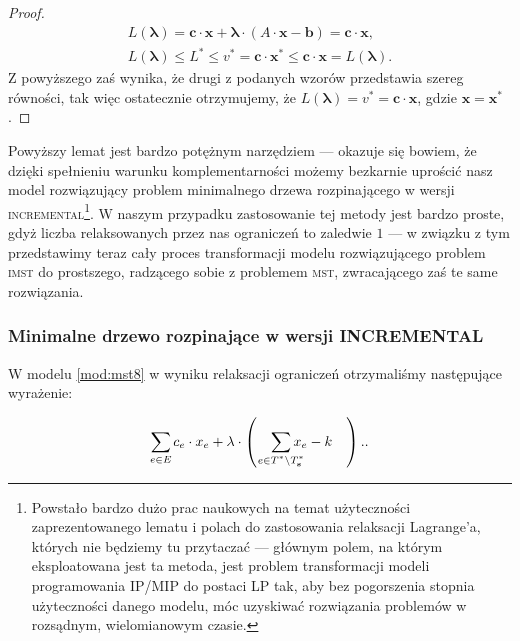 \begin{proof}
	\begin{gather}
		L \left( \boldsymbol{\lambda} \right) = \textbf{c} \cdot \textbf{x} + \boldsymbol{\lambda} \cdot \left( A \cdot \textbf{x} - \textbf{b} \right) = \textbf{c} \cdot \textbf{x}\text{,}\\
		L \left( \boldsymbol{\lambda} \right) \leqslant L^{\ast} \leqslant v^{\ast} = \textbf{c} \cdot \textbf{x}^{\ast} \leqslant \textbf{c} \cdot \textbf{x} = L \left( \boldsymbol{\lambda} \right)\text{.}
	\end{gather}
	Z powyższego zaś wynika, że drugi z podanych wzorów przedstawia szereg równości, tak więc ostatecznie otrzymujemy, że $L \left( \boldsymbol{\lambda} \right) = v^{\ast} = \textbf{c} \cdot \textbf{x}$, gdzie $\textbf{x} = \textbf{x}^{\ast}$.
\end{proof}

Powyższy lemat jest bardzo potężnym narzędziem --- okazuje się bowiem, że dzięki spełnieniu warunku komplementarności możemy bezkarnie uprościć nasz model rozwiązujący problem minimalnego drzewa rozpinającego w wersji \textsc{incremental}\footnote{Powstało bardzo dużo prac naukowych na temat użyteczności zaprezentowanego lematu i polach do zastosowania relaksacji Lagrange'a, których nie będziemy tu przytaczać --- głównym polem, na którym eksploatowana jest ta metoda, jest problem transformacji modeli programowania \textsc{IP}/\textsc{MIP} do postaci \textsc{LP} tak, aby bez pogorszenia stopnia użyteczności danego modelu, móc uzyskiwać rozwiązania problemów w rozsądnym, wielomianowym czasie.}. W naszym przypadku zastosowanie tej metody jest bardzo proste, gdyż liczba relaksowanych przez nas ograniczeń to zaledwie $1$ --- w związku z tym przedstawimy teraz cały proces transformacji modelu rozwiązującego problem \textsc{imst} do prostszego, radzącego sobie z problemem \textsc{mst}, zwracającego zaś te same rozwiązania.

\subsubsection{Minimalne drzewo rozpinające w wersji INCREMENTAL}

W modelu \ref{mod:mst8} w wyniku relaksacji ograniczeń otrzymaliśmy następujące wyrażenie:

\begin{equation}\label{eq:imstrelax}
	\sum_{\mathclap{e \in E}} c_{e} \cdot x_{e} + \lambda \cdot \left( \quad \sum_{\mathclap{e \in T^{\ast} \setminus T^{\ast}_{\textbf{s}}}} x_{e} - k \quad \right)\text{.}.
\end{equation}

